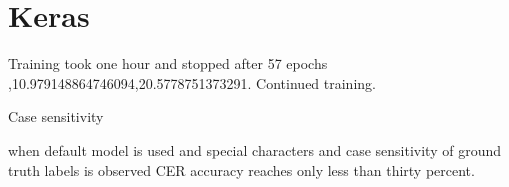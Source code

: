 \section{Keras}

Training took one hour and stopped after 57 epochs ,10.979148864746094,20.5778751373291. Continued training.










Case sensitivity


when default model is used and special characters and case sensitivity of ground truth labels is observed CER accuracy reaches only less than thirty percent. 

